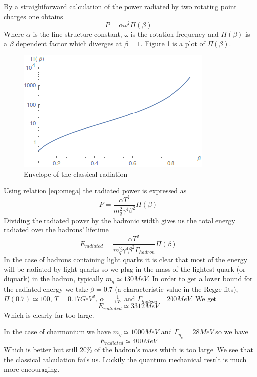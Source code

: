 \documentclass[11pt,a4paper]{article}
\begin{document}
By a straightforward calculation of the power radiated by two rotating point charges one obtains
\begin{equation}
P=\alpha \omega^2 \Pi\left(\beta\right)
\end{equation}
Where $\alpha$ is the fine structure constant, $\omega$ is the rotation frequency and $\Pi\left(\beta\right)$ is a $\beta$ dependent factor which diverges at $\beta=1$. Figure \ref{fig:radiation} is a plot of $\Pi\left(\beta\right)$.
\begin{figure}[h]
\centering
\includegraphics[scale=0.7]{figures/radiation.png}
\caption{Envelope of the classical radiation}
\label{fig:radiation}
\end{figure}
Using relation \ref{eq:omega} the radiated power is expressed as
\begin{equation}
P=\frac{\alpha T^2}{m_q^2 \gamma^4\beta^2} \Pi\left(\beta\right)
\end{equation}
Dividing the radiated power by the hadronic width gives us the total energy radiated over the hadrons' lifetime
\begin{equation}
E_{radiated}=\frac{\alpha T^2}{m_q^2 \gamma^4\beta^2 \Gamma_{hadron}} \Pi\left(\beta\right)
\end{equation}
In the case of hadrons containing light quarks it is clear that most of the energy will be radiated by light quarks so we plug in the mass of the lightest quark (or diquark) in the hadron, typically $m_q\simeq 130 MeV$. In order to get a lower bound for the radiated energy we take $\beta=0.7$ (a characteristic value in the Regge fits),$\Pi(0.7)\simeq 100$, $T=0.17 GeV^2$, $\alpha=\frac{1}{137}$ and $\Gamma_{hadron}=200 MeV$. We get
\begin{equation}
E_{radiated}\simeq 3312 MeV
\end{equation}
Which is clearly far too large.

In the case of charmonium we have $m_q\simeq 1000 MeV$ and $\Gamma_{\eta_c}=28 MeV$ so we have
\begin{equation}
E_{radiated}\simeq 400 MeV
\end{equation}
Which is better but still 20\% of the hadron's mass which is too large.
We see that the classical calculation fails us. Luckily the quantum mechanical result is much more encouraging.
\end{document}
